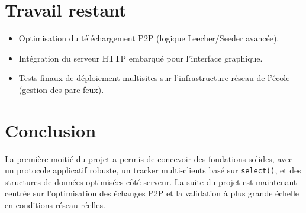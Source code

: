 \documentclass[11pt, a4paper]{article}
\begin{document}
\section{Travail restant}
\begin{itemize}
    \item Optimisation du téléchargement P2P (logique Leecher/Seeder avancée).
    \item Intégration du serveur HTTP embarqué pour l'interface graphique.
    \item Tests finaux de déploiement multisites sur l'infrastructure réseau de l'école (gestion des pare-feux).
\end{itemize}

\section{Conclusion}
La première moitié du projet a permis de concevoir des fondations solides, avec un protocole applicatif robuste, un tracker multi-clients basé sur \texttt{select()}, et des structures de données optimisées côté serveur. La suite du projet est maintenant centrée sur l'optimisation des échanges P2P et la validation à plus grande échelle en conditions réseau réelles.
\end{document}
